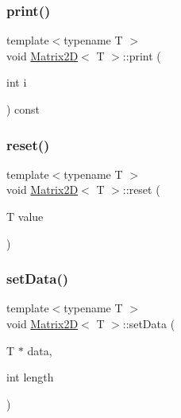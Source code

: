\mbox{\label{classMatrix2D_a27ccf42f23c568b2397b744ec32a41d1_a27ccf42f23c568b2397b744ec32a41d1}} 
\subsubsection{\texorpdfstring{print()}{print()}}
{\footnotesize\ttfamily template$<$typename T $>$ \\
void \mbox{\hyperlink{classMatrix2D}{Matrix2D}}$<$ T $>$\+::print (\begin{DoxyParamCaption}\item[{int}]{i }\end{DoxyParamCaption}) const}

\mbox{\label{classMatrix2D_a1a646829a2e9d166e0e47439de633b95_a1a646829a2e9d166e0e47439de633b95}} 
\subsubsection{\texorpdfstring{reset()}{reset()}}
{\footnotesize\ttfamily template$<$typename T $>$ \\
void \mbox{\hyperlink{classMatrix2D}{Matrix2D}}$<$ T $>$\+::reset (\begin{DoxyParamCaption}\item[{T}]{value }\end{DoxyParamCaption})}

\mbox{\label{classMatrix2D_a28515c515652637734a22a3440e80258_a28515c515652637734a22a3440e80258}} 
\subsubsection{\texorpdfstring{set\+Data()}{setData()}}
{\footnotesize\ttfamily template$<$typename T $>$ \\
void \mbox{\hyperlink{classMatrix2D}{Matrix2D}}$<$ T $>$\+::set\+Data (\begin{DoxyParamCaption}\item[{T $\ast$}]{data,  }\item[{int}]{length }\end{DoxyParamCaption})}

